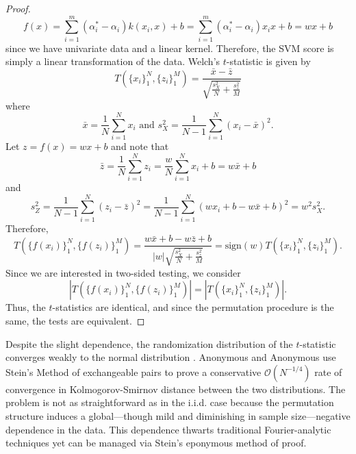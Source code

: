 \begin{proof}
  \begin{equation*}
    f(x)=\sum_{i=1}^m(\alpha_i^*-\alpha_i)k(x_i,x)+b =
    \sum_{i=1}^m(\alpha_i^*-\alpha_i)x_ix+b = wx+b
  \end{equation*}
  since we have univariate data and a linear kernel.
  Therefore, the SVM score is simply a linear transformation of the
  data.  Welch's $t$-statistic is given by
  \begin{equation*}
    T(\{x_i\}_1^N,\{z_i\}_1^M) = \frac{\bar{x}-\bar{z}}{\sqrt{\frac{s_X^2}{N}+\frac{s_z^2}{M}}}
  \end{equation*}
  where 
  \begin{equation*}
    \bar{x}=\frac{1}{N}\sum_{i=1}^N x_i \text{ and }
    s_X^2= \frac{1}{N-1}\sum_{i=1}^N(x_i-\bar{x})^2.
  \end{equation*}
  Let $z=f(x)=wx+b$ and note that 
  \begin{equation*}
    \bar{z}=\frac{1}{N}\sum_{i=1}^N z_i = \frac{w}{N}\sum_{i=1}^N x_i
    + b = w\bar{x}+b
  \end{equation*}
  and 
  \begin{equation*}
    s_Z^2= \frac{1}{N-1}\sum_{i=1}^N(z_i-\bar{z})^2= \frac{1}{N-1}\sum_{i=1}^N(wx_i+b-w\bar{x}+b)^2=w^2s_X^2.
  \end{equation*}
  Therefore, 
  \begin{equation*}
    T(\{f(x_i)\}_1^N,\{f(z_i)\}_1^M) =
    \frac{w\bar{x}+b-w\bar{z}+b}{|w|\sqrt{\frac{s_X^2}{N}+\frac{s_z^2}{M}}}
    = \text{sign}(w) T(\{x_i\}_1^N,\{z_i\}_1^M).
  \end{equation*}
  Since we are interested in two-sided testing, we consider
  \begin{equation*}
    |T(\{f(x_i)\}_1^N,\{f(z_i)\}_1^M)| = |T(\{x_i\}_1^N,\{z_i\}_1^M)|.
  \end{equation*}
  Thus, the $t$-statistics are identical, and since the permutation
  procedure is the same, the tests are equivalent.
\end{proof}

Despite the slight dependence, the randomization distribution of the
$t$-statistic converges weakly to the normal distribution
\cite{lehmann1999elements}.  Anonymous and Anonymous \cite{rayholmes2012} use
Stein's Method of exchangeable pairs \cite{chen2010normal,
  stein1986approximate} to prove a conservative
$\mathcal{O}(N^{-1/4})$ rate of convergence in Kolmogorov-Smirnov
distance between the two distributions.  The problem is not as
straightforward as in the i.i.d. case because the permutation
structure induces a global---though mild and diminishing in sample
size---negative dependence in the data.  This dependence thwarts
traditional Fourier-analytic techniques yet can be managed via Stein's
eponymous method of proof.  

